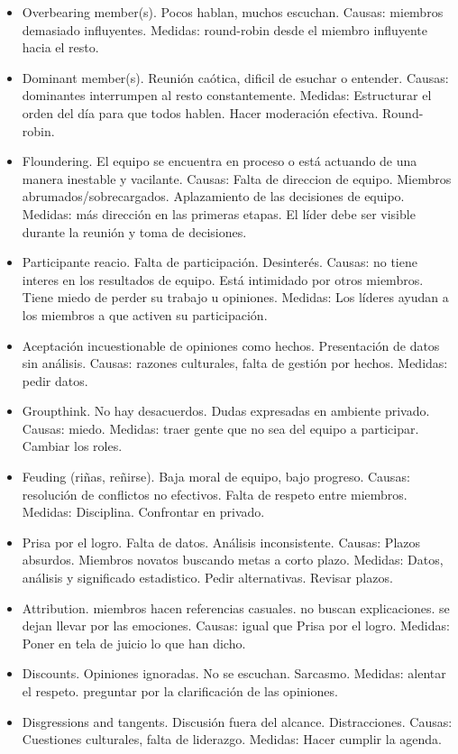 \documentclass[]{article}
\begin{document}
\begin{itemize}
	\item Overbearing member(s). Pocos hablan, muchos escuchan. Causas: miembros demasiado influyentes. Medidas: round-robin desde el miembro influyente hacia el resto.
	\item Dominant member(s). Reunión caótica, dificil de esuchar o entender. Causas: dominantes interrumpen al resto constantemente. Medidas: Estructurar el orden del día para que todos hablen. Hacer moderación efectiva. Round-robin.
	\item Floundering. El equipo se encuentra en proceso o está actuando de una manera inestable y vacilante. Causas: Falta de direccion de equipo. Miembros abrumados/sobrecargados. Aplazamiento de las decisiones de equipo. Medidas: más dirección en las primeras etapas. El líder debe ser visible durante la reunión y toma de decisiones.
	\item Participante reacio. Falta de participación. Desinterés. Causas: no tiene interes en los resultados de equipo. Está intimidado por otros miembros. Tiene miedo de perder su trabajo u opiniones. Medidas: Los líderes ayudan a los miembros a que activen su participación.
	\item Aceptación incuestionable de opiniones como hechos. Presentación de datos sin análisis. Causas: razones culturales, falta de gestión por hechos. Medidas: pedir datos.
	\item Groupthink. No hay desacuerdos. Dudas expresadas en ambiente privado. Causas: miedo. Medidas: traer gente que no sea del equipo a participar. Cambiar los roles.
	\item Feuding (riñas, reñirse). Baja moral de equipo, bajo progreso. Causas: resolución de conflictos no efectivos. Falta de respeto entre miembros. Medidas: Disciplina. Confrontar en privado. 
	\item Prisa por el logro. Falta de datos. Análisis inconsistente. Causas: Plazos absurdos. Miembros novatos buscando metas a corto plazo. Medidas: Datos, análisis y significado estadistico. Pedir alternativas. Revisar plazos.
	\item Attribution. miembros hacen referencias casuales. no buscan explicaciones. se dejan llevar por las emociones. Causas: igual que Prisa por el logro. Medidas: Poner en tela de juicio lo que han dicho.
	\item Discounts. Opiniones ignoradas. No se escuchan. Sarcasmo. Medidas: alentar el respeto. preguntar por la clarificación de las opiniones.
	\item Disgressions and tangents. Discusión fuera del alcance. Distracciones. Causas: Cuestiones culturales, falta de liderazgo. Medidas: Hacer cumplir la agenda. 
\end{itemize}
\end{document}
